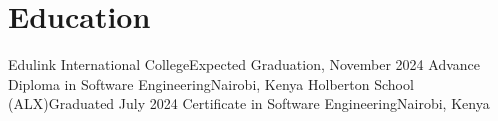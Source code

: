 \section{Education}
    \resumeSubHeadingListStart

    \resumeSubheading
    {Edulink International College}{Expected Graduation, November 2024}
    {Advance Diploma in Software Engineering}{Nairobi, Kenya}
    \resumeItemListStart
    \resumeItemListEnd
    \resumeSubheading
    {Holberton School (ALX)}{Graduated July 2024}
    {Certificate in Software Engineering}{Nairobi, Kenya}
    \resumeItemListStart
    \resumeItemListEnd

    \resumeSubHeadingListEnd